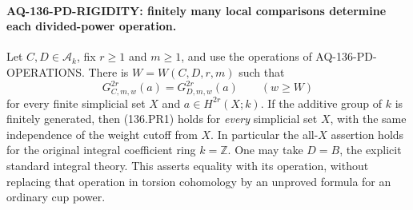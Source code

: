 \paragraph{AQ-136-PD-RIGIDITY: finitely many local comparisons determine each divided-power operation.}
Let $C,D\in\mathcal A_k$, fix $r\ge1$ and $m\ge1$,
and use the operations of AQ-136-PD-OPERATIONS.
There is $W=W(C,D,r,m)$ such that
\[
           G_{C,m,w}^{2r}(a)=G_{D,m,w}^{2r}(a)
                    \qquad(w\ge W)                       \tag{136.PR1}
\]
for every finite simplicial set $X$ and
$a\in H^{2r}(X;k)$.
If the additive group of $k$ is finitely generated,
then (136.PR1) holds for \emph{every} simplicial set
$X$, with the same independence of the weight cutoff
from $X$. In particular the all-$X$ assertion holds
for the original integral coefficient ring $k=\mathbb Z$.
One may take $D=B$, the explicit standard integral
theory. This asserts equality with its operation,
without replacing that operation in torsion cohomology
by an unproved formula for an ordinary cup power.

